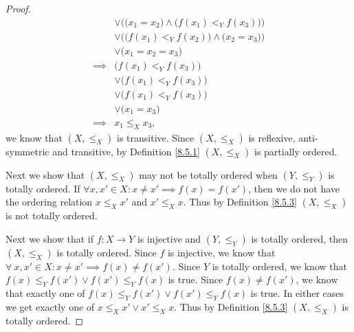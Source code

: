 \begin{proof}
\begin{align*}
                 & \lor \Big(\big(x_1 = x_2\big) \land \big(f(x_1) <_Y f(x_3)\big)\Big)                                                                \\
                 & \lor \Big(\big(f(x_1) <_Y f(x_2)\big) \land \big(x_2 = x_3\big)\Big)                                                                \\
                 & \lor \big(x_1 = x_2 = x_3\big)                                                                                                      \\
        \implies & \big(f(x_1) <_Y f(x_3)\big)                                                                                                         \\
                 & \lor \big(f(x_1) <_Y f(x_3)\big)                                                                                                    \\
                 & \lor \big(f(x_1) <_Y f(x_3)\big)                                                                                                    \\
                 & \lor \big(x_1 = x_3\big)                                                                                                            \\
        \implies & x_1 \leq_X x_3,
    \end{align*}
    we know that \((X, \leq_X)\) is transitive.
    Since \((X, \leq_X)\) is reflexive, anti-symmetric and transitive, by Definition \ref{8.5.1} \((X, \leq_X)\) is partially ordered.

    Next we show that \((X, \leq_X)\) may not be totally ordered when \((Y, \leq_Y)\) is totally ordered.
    If \(\forall x, x' \in X : x \neq x' \implies f(x) = f(x')\), then we do not have the ordering relation \(x \leq_X x'\) and \(x' \leq_X x\).
    Thus by Definition \ref{8.5.3} \((X, \leq_X)\) is not totally ordered.

    Next we show that if \(f : X \to Y\) is injective and \((Y, \leq_Y)\) is totally ordered, then \((X, \leq_X)\) is totally ordered.
    Since \(f\) is injective, we know that \(\forall\ x, x' \in X : x \neq x' \implies f(x) \neq f(x')\).
    Since \(Y\) is totally ordered, we know that \(f(x) \leq_Y f(x') \lor f(x') \leq_Y f(x)\) is true.
    Since \(f(x) \neq f(x')\), we know that exactly one of \(f(x) \leq_Y f(x') \lor f(x') \leq_Y f(x)\) is true.
    In either cases we get exactly one of \(x \leq_X x' \lor x' \leq_X x\).
    Thus by Definition \ref{8.5.3} \((X, \leq_X)\) is totally ordered.
\end{proof}

